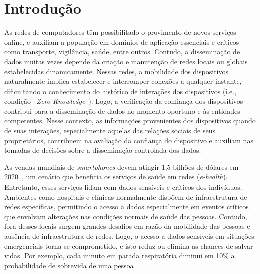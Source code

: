\documentclass[12pt]{article}
\newcommand{\as}[1]{\textcolor{blue}{{\bf #1}}}
\newcommand{\agn}[1]{\textcolor{auburn}{#1}}
\begin{document}
\section{Introdução}

As redes de computadores têm possibilitado o provimento de novos serviços online, e auxiliam a população em domínios de aplicação essenciais e críticos como transporte, vigilância, saúde, entre outros.
Contudo, a disseminação de dados muitas vezes depende da criação e manutenção de redes locais ou globais estabelecidas dinamicamente.
Nessas redes,
a mobilidade dos dispositivos naturalmente implica estabelecer e interromper conexões a qualquer instante, dificultando o conhecimento do histórico de interações
\agn{dos}
dispositivos (i.e., condição ~\textit{Zero-Knowledge}~\cite{kim2015hcs}). %
Logo,
\agn{a verificação da}
confiança dos dispositivos contribui para a disseminação de dados no momento oportuno e às entidades competentes.
\agn{Nesse contexto, as}
informações provenientes dos dispositivos quando de suas interações, especialmente aquelas 
das relações sociais de seus proprietários,
\agn{contribuem na avaliação da
confiança do dispositivo e auxiliam nas tomadas de decisões sobre a disseminação controlada dos dados.}

As vendas mundiais de \textit{smartphones} devem atingir 1,5 bilhões de dólares em 2020~\cite{statista2019}, um cenário que beneficia os serviços de saúde em redes (\textit{e-health}).
Entretanto, esses serviços lidam com dados sensíveis e críticos dos indivíduos. 
Ambientes como hospitais e clínicas normalmente dispõem de infraestrutura de redes específicas, permitindo o acesso a dados especialmente em eventos críticos que envolvam
alterações nas condições normais de saúde das pessoas. Contudo, fora desses locais surgem grandes desafios em razão da mobilidade das pessoas e ausência de infraestrutura de redes.
Logo, o acesso a dados sensíveis em situações emergenciais torna-se comprometido, e isto reduz ou elimina as chances de salvar vidas. Por exemplo, 
cada minuto em parada respiratória diminui em 10\% a probabilidade de sobrevida de uma pessoa~\cite{pazin2003parada}.
\end{document}

